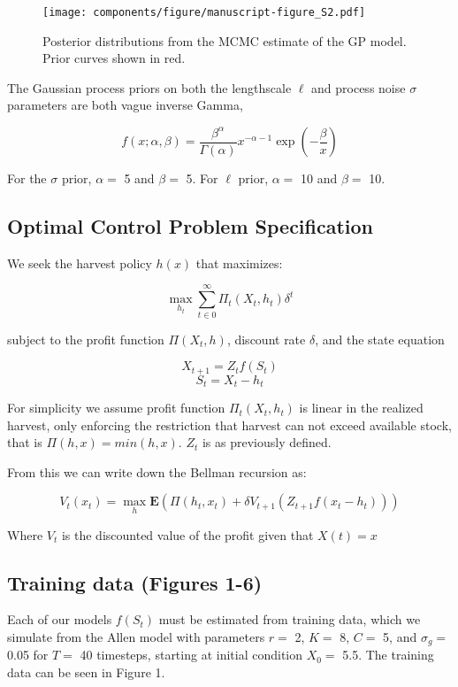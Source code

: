 \documentclass[author-year, 12pt,review]{elsarticle} %
\makeatletter
\def\maxwidth{\ifdim\Gin@nat@width>\linewidth\linewidth
\else\Gin@nat@width\fi}
\let\Oldincludegraphics\includegraphics
\renewcommand{\includegraphics}[1]{\Oldincludegraphics[width=\maxwidth]{#1}}
\makeatother
\begin{document}
\begin{figure}[htbp]
\centering
\texttt{[image: components/figure/manuscript-figure\_S2.pdf]}
\caption{Posterior distributions from the MCMC estimate of the GP model.
Prior curves shown in red.}
\end{figure}

The Gaussian process priors on both the lengthscale $\ell$ and process
noise $\sigma$ parameters are both vague inverse Gamma,

\[f(x; \alpha, \beta) = \frac{\beta^\alpha}{\Gamma(\alpha)} x^{-\alpha - 1}\exp\left(-\frac{\beta}{x}\right)\]

For the $\sigma$ prior, $\alpha = $ 5 and $\beta = $ 5. For $\ell$
prior, $\alpha = $ 10 and $\beta = $ 10.

\newpage

\subsection{Optimal Control Problem
Specification}\label{optimal-control-problem-specification}

We seek the harvest policy $h(x)$ that maximizes:

\[ \max_{h_t} \sum_{t \in 0}^{\infty}  \Pi_t(X_t, h_t) \delta^t  \]

subject to the profit function $\Pi(X_t,h)$, discount rate $\delta$, and
the state equation

\[X_{t+1} = Z_t f(S_t)  \] \[S_t = X_t - h_t \]

For simplicity we assume profit function $\Pi_t(X_t, h_t)$ is linear in
the realized harvest, only enforcing the restriction that harvest can
not exceed available stock, that is $\Pi(h,x) = min(h,x)$. $Z_t$ is as
previously defined.

From this we can write down the Bellman recursion as:

\[V_t(x_t) = \max_h \mathbf{E} \left(\Pi(h_t, x_t) + \delta V_{t+1}( Z_{t+1} f(x_t - h_t)) \right)\]

Where $V_t$ is the discounted value of the profit given that $X(t) = x$

\subsection{Training data (Figures
1-6)}\label{training-data-figures-1-6}

Each of our models $f(S_t)$ must be estimated from training data, which
we simulate from the Allen model with parameters $r = $ 2, $K =$ 8,
$C =$ 5, and $\sigma_g =$ 0.05 for $T=$ 40 timesteps, starting at
initial condition $X_0 = $ 5.5. The training data can be seen in Figure
1.
\end{document}
